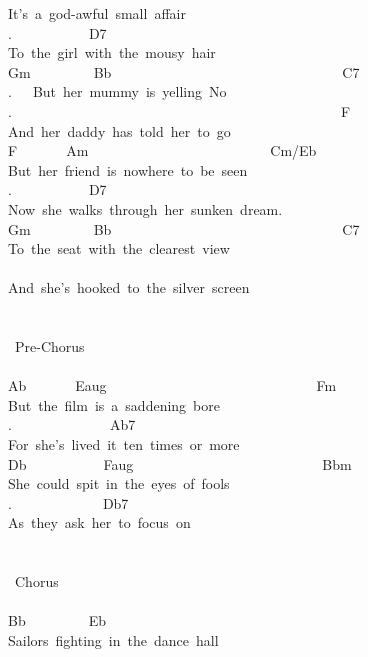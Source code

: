 {It's\ a\ god-awful\ small\ affair\\
.\ \ \ \ \ \ \ \ \ \ \ D7\\
To\ the\ girl\ with\ the\ mousy\ hair\\
Gm\ \ \ \ \ \ \ \ \ Bb\ \ \ \ \ \ \ \ \ \ \ \ \ \ \ \ \ \ \ \ \ \ \ \ \ \ \ \ \ \ \ \ \ C7\\
.\ \ \ But\ her\ mummy\ is\ yelling\ \;No\;\\
.\ \ \ \ \ \ \ \ \ \ \ \ \ \ \ \ \ \ \ \ \ \ \ \ \ \ \ \ \ \ \ \ \ \ \ \ \ \ \ \ \ \ \ \ \ \ \ F\\
And\ her\ daddy\ has\ told\ her\ to\ go\\
F\ \ \ \ \ \ \ Am\ \ \ \ \ \ \ \ \ \ \ \ \ \ \ \ \ \ \ \ \ \ \ \ \ \ Cm/Eb\\
But\ her\ friend\ is\ nowhere\ to\ be\ seen\\
.\ \ \ \ \ \ \ \ \ \ \ D7\\
Now\ she\ walks\ through\ her\ sunken\ dream.\\
Gm\ \ \ \ \ \ \ \ \ Bb\ \ \ \ \ \ \ \ \ \ \ \ \ \ \ \ \ \ \ \ \ \ \ \ \ \ \ \ \ \ \ \ \ C7\\
To\ the\ seat\ with\ the\ clearest\ view\\
\\
And\ she's\ hooked\ to\ the\ silver\ screen\\
\\
\\
\lbrack\ Pre-Chorus\rbrack\\
\\
Ab\ \ \ \ \ \ \ Eaug\ \ \ \ \ \ \ \ \ \ \ \ \ \ \ \ \ \ \ \ \ \ \ \ \ \ \ \ \ \ Fm\\
But\ the\ film\ is\ a\ saddening\ bore\\
.\ \ \ \ \ \ \ \ \ \ \ \ \ \ Ab7\\
For\ she's\ lived\ it\ ten\ times\ or\ more\\
Db\ \ \ \ \ \ \ \ \ \ \ Faug\ \ \ \ \ \ \ \ \ \ \ \ \ \ \ \ \ \ \ \ \ \ \ \ \ \ \ Bbm\\
She\ could\ spit\ in\ the\ eyes\ of\ fools\\
.\ \ \ \ \ \ \ \ \ \ \ \ \ Db7\\
As\ they\ ask\ her\ to\ focus\ on\\
\\
\\
\lbrack\ Chorus\rbrack\\
\\
Bb\ \ \ \ \ \ \ \ \ Eb\\
Sailors\ fighting\ in\ the\ dance\ hall\\
}
